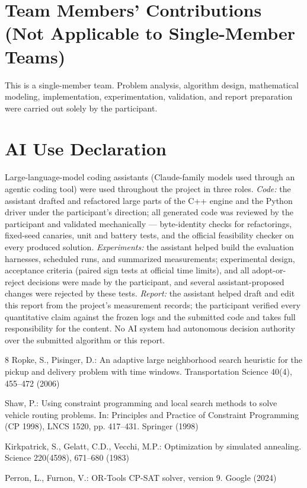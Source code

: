\documentclass[runningheads]{llncs}
\begin{document}

\section{Team Members' Contributions\\ (Not Applicable to Single-Member Teams)}

This is a single-member team. Problem analysis, algorithm design,
mathematical modeling, implementation, experimentation, validation, and
report preparation were carried out solely by the participant.


\section{AI Use Declaration}

Large-language-model coding assistants (Claude-family models used through an
agentic coding tool) were used throughout the project in three roles.
\emph{Code:} the assistant drafted and refactored large parts of the C++
engine and the Python driver under the participant's direction; all generated
code was reviewed by the participant and validated mechanically ---
byte-identity checks for refactorings, fixed-seed canaries, unit and battery
tests, and the official feasibility checker on every produced solution.
\emph{Experiments:} the assistant helped build the evaluation harnesses,
scheduled runs, and summarized measurements; experimental design, acceptance
criteria (paired sign tests at official time limits), and all
adopt-or-reject decisions were made by the participant, and several
assistant-proposed changes were rejected by these tests. \emph{Report:} the
assistant helped draft and edit this report from the project's measurement
records; the participant verified every quantitative claim against the
frozen logs and the submitted code and takes full responsibility for the
content. No AI system had autonomous decision authority over the submitted
algorithm or this report.

\begin{thebibliography}{8}
Ropke, S., Pisinger, D.: An adaptive large neighborhood search heuristic for
the pickup and delivery problem with time windows. Transportation Science
40(4), 455--472 (2006)

Shaw, P.: Using constraint programming and local search methods to solve
vehicle routing problems. In: Principles and Practice of Constraint
Programming (CP 1998), LNCS 1520, pp. 417--431. Springer (1998)

Kirkpatrick, S., Gelatt, C.D., Vecchi, M.P.: Optimization by simulated
annealing. Science 220(4598), 671--680 (1983)

Perron, L., Furnon, V.: OR-Tools CP-SAT solver, version 9. Google (2024)
\end{thebibliography}
\end{document}
